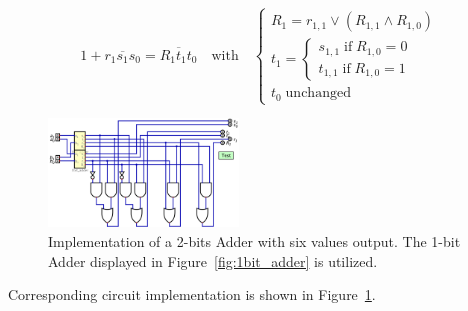 \documentclass[conference]{IEEEtran}
\begin{document}
\begin{equation}
    1 + \overline{r_1 s_1 s_0} = \overline{R_1 t_1 t_0} \quad \text{with} \quad \begin{cases}
    R_1 = r_{1,1} \vee (R_{1,1} \wedge R_{1,0}) \\ 
    t_1 = \begin{cases}
        s_{1, 1} \; \text{if} \; R_{1, 0} = 0 \\
        t_{1, 1} \; \text{if} \; R_{1, 0} = 1 
    \end{cases} \\
    t_0 \; \text{unchanged}
    \end{cases}
\end{equation}



\begin{figure}[h!]
\centering
\includegraphics[width=0.45\textwidth]{assets/2bits_adder.png}
\caption{Implementation of a 2-bits Adder with six values output. The 1-bit Adder displayed in Figure~\ref{fig:1bit_adder} is utilized.}
\label{fig:2bits_adder}
\end{figure}

Corresponding circuit implementation is shown in Figure~\ref{fig:2bits_adder}.
\end{document}
